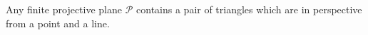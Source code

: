 Any finite projective plane $\mathcal{P}$ contains a pair of triangles which are in perspective from a point and a line.
